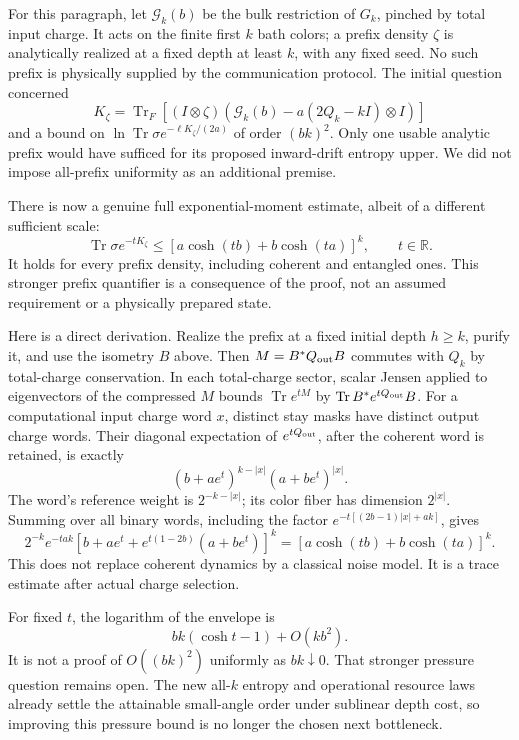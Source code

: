 \documentclass[11pt]{article}
\newcommand{\Tr}{\operatorname{Tr}}
\begin{document}
For this paragraph, let \(\mathcal G_k(b)\) be the bulk restriction of
\(G_k\), pinched by total input charge. It acts on the finite first
\(k\) bath colors; a prefix density \(\zeta\) is analytically realized
at a fixed depth at least \(k\), with any fixed seed. No such prefix
is physically supplied by the communication protocol.
The initial question concerned
\[
 K_\zeta=\Tr_F[(I\otimes\zeta)
       (\mathcal G_k(b)-a(2Q_k-kI)\otimes I)]
\]
and a bound on
\(\ln\Tr\sigma e^{-\ell K_\zeta/(2a)}\) of order \((bk)^2\).
Only one usable analytic prefix would have sufficed for its proposed
inward-drift entropy upper. We did not impose all-prefix uniformity as
an additional premise.

There is now a genuine full exponential-moment estimate, albeit of a
different sufficient scale:
\begin{equation}\label{eq:bulkmoment}
 \Tr\sigma e^{-tK_\zeta}
 \le[a\cosh(tb)+b\cosh(ta)]^k,\qquad t\in\mathbb R.
\end{equation}
It holds for every prefix density, including coherent and entangled ones.
This stronger prefix quantifier is a consequence of the proof, not an
assumed requirement or a physically prepared state.

Here is a direct derivation. Realize the prefix at a fixed initial depth
\(h\ge k\), purify it, and use the isometry \(B\) above.
Then \(M=B^*Q_{\rm out}B\) commutes with \(Q_k\) by total-charge
conservation. In each total-charge sector, scalar Jensen applied to
eigenvectors of the compressed \(M\) bounds
\(\Tr e^{tM}\) by \(\Tr B^*e^{tQ_{\rm out}}B\).
For a computational input charge word \(x\), distinct stay masks have
distinct output charge words. Their diagonal expectation of
\(e^{tQ_{\rm out}}\), after the coherent word is retained, is exactly
\[
 (b+ae^t)^{k-|x|}(a+be^t)^{|x|}.
\]
The word's reference weight is \(2^{-k-|x|}\); its color fiber has
dimension \(2^{|x|}\). Summing over all binary words, including the
factor \(e^{-t[(2b-1)|x|+ak]}\), gives
\[
 2^{-k}e^{-tak}
 [b+ae^t+e^{t(1-2b)}(a+be^t)]^k
 =[a\cosh(tb)+b\cosh(ta)]^k.
\]
This does not replace coherent dynamics by a classical noise model.
It is a trace estimate after actual charge selection.

For fixed \(t\), the logarithm of the envelope is
\[
 bk(\cosh t-1)+O(kb^2).
\]
It is not a proof of \(O((bk)^2)\) uniformly as \(bk\downarrow0\).
That stronger pressure question remains open. The new all-\(k\)
entropy and operational resource laws already settle the attainable
small-angle order under sublinear depth cost, so improving this pressure
bound is no longer the chosen next bottleneck.
\end{document}
